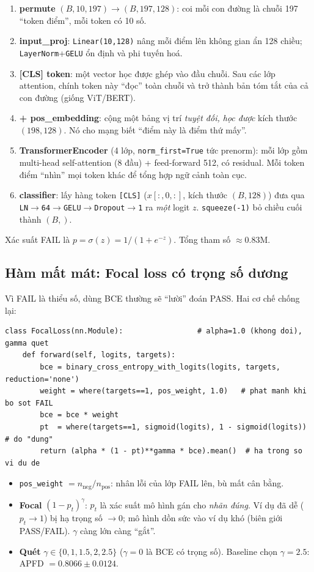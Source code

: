 \documentclass[11pt]{article}
\newcommand{\code}[1]{\textcolor{cInk}{\texttt{#1}}}
\theoremstyle{definition}
\begin{document}
\begin{enumerate}[leftmargin=1.6em,label=\textbf{B\arabic*.}]
\item \textbf{permute} $(B,10,197)\!\to\!(B,197,128)$: coi mỗi con đường là chuỗi
197 ``token điểm'', mỗi token có 10 số.
\item \textbf{input\_proj}: \code{Linear(10,128)} nâng mỗi điểm lên không gian
ẩn 128 chiều; \code{LayerNorm}+\code{GELU} ổn định và phi tuyến hoá.
\item \textbf{[CLS] token}: một vector học được ghép vào đầu chuỗi. Sau các lớp
attention, chính token này ``đọc'' toàn chuỗi và trở thành bản tóm tắt của cả
con đường (giống ViT/BERT).
\item \textbf{+ pos\_embedding}: cộng một bảng vị trí \emph{tuyệt đối, học được}
kích thước $(198,128)$. Nó cho mạng biết ``điểm này là điểm thứ mấy''.
\item \textbf{TransformerEncoder} (4 lớp, \code{norm\_first=True} tức prenorm):
mỗi lớp gồm multi-head self-attention (8 đầu) + feed-forward 512, có residual.
Mỗi token điểm ``nhìn'' mọi token khác để tổng hợp ngữ cảnh toàn cục.
\item \textbf{classifier}: lấy hàng token \code{[CLS]} ($x[:,0,:]$, kích thước
$(B,128)$) đưa qua \code{LN$\to$64$\to$GELU$\to$Dropout$\to$1} ra \emph{một}
logit $z$. \code{squeeze(-1)} bỏ chiều cuối thành $(B,)$.
\end{enumerate}
Xác suất FAIL là $p=\sigma(z)=1/(1+e^{-z})$. Tổng tham số $\approx 0.83$M.

\subsection{Hàm mất mát: Focal loss có trọng số dương}
\label{sec:focalA}
Vì FAIL là thiểu số, dùng BCE thường sẽ ``lười'' đoán PASS. Hai cơ chế chống lại:
\begin{lstlisting}
class FocalLoss(nn.Module):                 # alpha=1.0 (khong doi), gamma quet
    def forward(self, logits, targets):
        bce = binary_cross_entropy_with_logits(logits, targets, reduction='none')
        weight = where(targets==1, pos_weight, 1.0)   # phat manh khi bo sot FAIL
        bce = bce * weight
        pt  = where(targets==1, sigmoid(logits), 1 - sigmoid(logits))  # do "dung"
        return (alpha * (1 - pt)**gamma * bce).mean()  # ha trong so vi du de
\end{lstlisting}
\begin{itemize}[leftmargin=1.4em]
\item \code{pos\_weight} $=n_{\text{neg}}/n_{\text{pos}}$: nhân lỗi của lớp FAIL
lên, bù mất cân bằng.
\item \textbf{Focal} $(1-p_t)^\gamma$: $p_t$ là xác suất mô hình gán cho
\emph{nhãn đúng}. Ví dụ đã dễ ($p_t\to1$) bị hạ trọng số $\to0$; mô hình dồn sức
vào ví dụ khó (biên giới PASS/FAIL). $\gamma$ càng lớn càng ``gắt''.
\item \textbf{Quét} $\gamma\in\{0,1,1.5,2,2.5\}$ ($\gamma{=}0$ là BCE có trọng
số). Baseline chọn $\gamma=\mathbf{2.5}$: APFD $=\mathbf{0.8066\pm0.0124}$.
\end{itemize}
\end{document}
